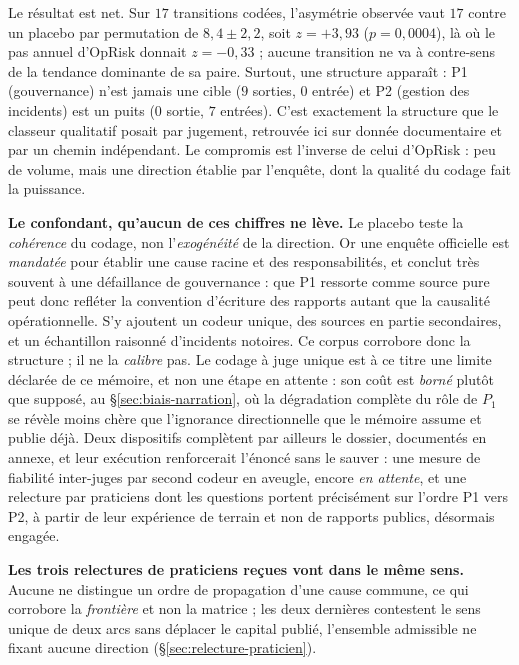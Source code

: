 Le résultat est net. Sur $17$ transitions codées, l'asymétrie observée vaut $17$ contre un
placebo par permutation de $8{,}4 \pm 2{,}2$, soit $z=+3{,}93$ ($p=0{,}0004$), là où le pas
annuel d'OpRisk donnait $z=-0{,}33$ ; aucune transition ne va à contre-sens de la
tendance dominante de sa paire. Surtout, une structure apparaît :
P1 (gouvernance) n'est jamais une cible ($9$ sorties, $0$ entrée) et P2
(gestion des incidents) est un puits ($0$ sortie, $7$ entrées). C'est exactement la structure
que le classeur qualitatif posait par jugement, retrouvée ici sur donnée documentaire et par un
chemin indépendant. Le compromis est l'inverse de celui d'OpRisk : peu de volume, mais une
direction établie par l'enquête, dont la qualité du codage fait la puissance.

\begin{attention}
\textbf{Le confondant, qu'aucun de ces chiffres ne lève.} Le placebo teste la \emph{cohérence}
du codage, non l'\emph{exogénéité} de la direction. Or une enquête officielle est \emph{mandatée}
pour établir une cause racine et des responsabilités, et conclut très souvent à une
\og{}défaillance de gouvernance\fg{} : que P1 ressorte comme source pure peut donc refléter la
convention d'écriture des rapports autant que la causalité opérationnelle. S'y ajoutent
un codeur unique, des sources en partie secondaires, et un échantillon raisonné d'incidents
notoires. Ce corpus corrobore donc la structure ; il ne la \emph{calibre} pas. Le
codage à juge unique est à ce titre une limite déclarée de ce mémoire, et non une étape
en attente : son coût est \emph{borné} plutôt que supposé, au \S\ref{sec:biais-narration}, où la
dégradation complète du rôle de $P_1$ se révèle moins chère que l'ignorance directionnelle que
le mémoire assume et publie déjà. Deux dispositifs complètent par ailleurs le dossier, documentés en annexe, et leur exécution
renforcerait l'énoncé sans le sauver : une mesure de fiabilité inter-juges par second
codeur en aveugle, encore \emph{en attente}, et une relecture par praticiens dont les
questions portent précisément sur l'ordre P1 vers P2, à partir de leur expérience de terrain et
non de rapports publics, désormais engagée.

\textbf{Les trois relectures de praticiens reçues vont dans le même sens.} Aucune ne distingue un
ordre de propagation d'une cause commune, ce qui corrobore la \emph{frontière} et non la matrice ;
les deux dernières contestent le sens unique de deux arcs sans déplacer le capital publié,
l'ensemble admissible ne fixant aucune direction (\S\ref{sec:relecture-praticien}).
\end{attention}


